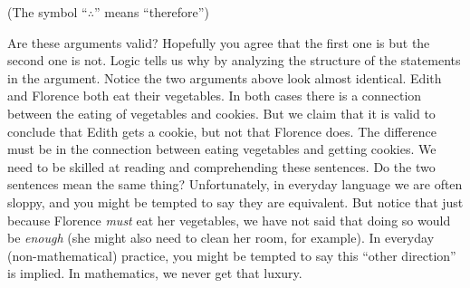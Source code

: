 \documentclass[12pt,]{book}
\theoremstyle{plain}
\theoremstyle{definition}
\theoremstyle{definition}
\theoremstyle{definition}
\numberwithin{equation}{chapter}
\begin{document}
\par
\hypertarget{p-1018}{}%
(The symbol ``\(\therefore\)''\label{notation-28}
 means ``therefore'')%
\par
\hypertarget{p-1019}{}%
Are these arguments valid? Hopefully you agree that the first one is but the second one is not. Logic tells us why by analyzing the structure of the statements in the argument. Notice the two arguments above look almost identical. Edith and Florence both eat their vegetables. In both cases there is a connection between the eating of vegetables and cookies. But we claim that it is valid to conclude that Edith gets a cookie, but not that Florence does. The difference must be in the connection between eating vegetables and getting cookies. We need to be skilled at reading and comprehending these sentences. Do the two sentences mean the same thing? Unfortunately, in everyday language we are often sloppy, and you might be tempted to say they are equivalent. But notice that just because Florence \emph{must} eat her vegetables, we have not said that doing so would be \emph{enough} (she might also need to clean her room, for example). In everyday (non-mathematical) practice, you might be tempted to say this ``other direction'' is implied. In mathematics, we never get that luxury.%
\typeout{************************************************}
\typeout{************************************************}
\end{document}
